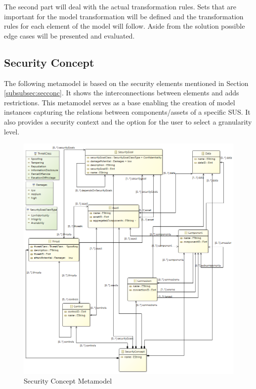The second part will deal with the actual transformation rules. Sets that are important for the model transformation will be defined and the transformation rules for each element of the model will follow. Aside from the solution possible edge cases will be presented and evaluated.

\label{sec:approach}
\subsection{Security Concept}
\label{subsec:sec_concept}
The following metamodel is based on the security elements mentioned in Section \ref{subsubsec:secconc}. It shows the interconnections between elements and adds restrictions. This metamodel serves as a base enabling the creation of model instances capturing the relations between components/assets of a specific SUS. It also provides a security context and the option for the user to select a granularity level. 

\begin{figure}[H]
\centering
\includegraphics[width=1.2\textwidth]{pictures/concept_metamodel.png}
\caption{Security Concept Metamodel}
\label{fig:concept_metamodel}
\end{figure}

